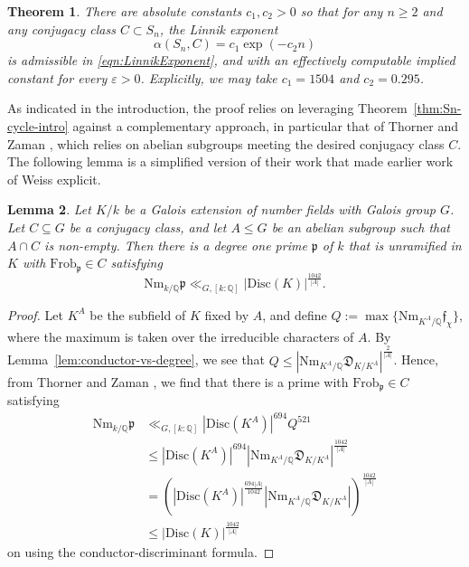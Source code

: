 \documentclass[12pt]{amsart}
\newtheorem{theorem}{Theorem}
\newtheorem{lemma}[theorem]{Lemma}
\theoremstyle{definition} \newtheorem{definition}[theorem]{Definition}
\theoremstyle{example} \newtheorem{example}[theorem]{Example}
\theoremstyle{remark} \newtheorem{remark}{Remark}[theorem]
\numberwithin{equation}{section}
\numberwithin{theorem}{section}
\renewcommand{\epsilon}{\varepsilon}
\renewcommand{\leq}{\leqslant}
\renewcommand{\geq}{\geqslant}
\begin{document}
	\begin{theorem} \label{thm:optimized-Sn-asymptotic}
		There are absolute constants $c_1,c_2>0$ so that for any $n \geq 2$ and any conjugacy class $C \subset S_n$, the Linnik exponent 
			\[
				\alpha(S_n,C) = c_1 \exp(-c_2 n)
			\]
		is admissible in \eqref{eqn:LinnikExponent}, and with an effectively computable implied constant for every $\epsilon>0$.  Explicitly, we may take $c_1 = 1504$ and $c_2 = 0.295$.
	\end{theorem}
	
	
	As indicated in the introduction, the proof relies on leveraging Theorem~\ref{thm:Sn-cycle-intro} against a complementary approach, in particular that of Thorner and Zaman \cite{ThornerZaman-Explicit}, which relies on abelian subgroups meeting the desired conjugacy class $C$.  The following lemma is a simplified version of their work that made earlier work of Weiss \cite{Weiss} explicit.
	
	\begin{lemma} \label{lem:abelian-least-prime}
		Let $K/k$ be a Galois extension of number fields with Galois group $G$.  Let $C \subseteq G$ be a conjugacy class, and let $A \leq G$ be an abelian subgroup such that $A \cap C$ is non-empty.  Then there is a degree one prime $\mathfrak{p}$ of $k$ that is unramified in $K$ with $\mathrm{Frob}_\mathfrak{p} \in C$ satisfying
			\[
				\mathrm{Nm}_{k/\mathbb{Q}} \mathfrak{p}
					\ll_{G,[k:\mathbb{Q}]} |\mathrm{Disc}(K)|^{\frac{1042}{|A|}}.
			\]
	\end{lemma}
	\begin{proof}
		Let $K^A$ be the subfield of $K$ fixed by $A$, and define $Q := \max\{ \mathrm{Nm}_{K^A/\mathbb{Q}} \mathfrak{f}_\chi\}$, where the maximum is taken over the irreducible characters of $A$.  By Lemma~\ref{lem:conductor-vs-degree}, we see that $Q \leq |\mathrm{Nm}_{K^A/\mathbb{Q}} \mathfrak{D}_{K/K^A}|^{\frac{2}{|A|}}$.  Hence, from Thorner and Zaman \cite[Theorem 1.1]{ThornerZaman-Explicit}, we find that there is a prime with $\mathrm{Frob}_\mathfrak{p} \in C$ satisfying
			\begin{align*}
				\mathrm{Nm}_{k/\mathbb{Q}} \mathfrak{p}
					& \ll_{G,[k:\mathbb{Q}]} |\mathrm{Disc}(K^A)|^{694} Q^{521}  \\
					& \leq |\mathrm{Disc}(K^A)|^{694} |\mathrm{Nm}_{K^A/\mathbb{Q}} \mathfrak{D}_{K/K^A}|^{\frac{1042}{|A|}} \\
					& = \left( |\mathrm{Disc}(K^A)|^{\frac{694 |A|}{1042}} |\mathrm{Nm}_{K^A/\mathbb{Q}} \mathfrak{D}_{K/K^A}| \right)^{\frac{1042}{|A|}} \\
					& \leq |\mathrm{Disc}(K)|^{\frac{1042}{|A|}}
			\end{align*}
		on using the conductor-discriminant formula.
	\end{proof}
	
\end{document}
